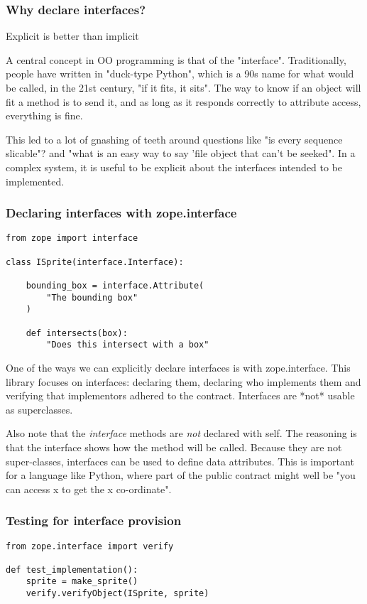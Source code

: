 \documentclass[ignorenonframetext,aspectration=169]{beamer}
\begin{document}
\begin{frame}[fragile]
\frametitle{Why declare interfaces?}

Explicit is better than implicit
\end{frame}

A central concept in OO programming is that of the "interface".
Traditionally,
people have written in "duck-type Python",
which is a 90s name for what would be called,
in the 21st century,
"if it fits, it sits".
The way to know if an object will fit a method is to send it,
and as long as it responds correctly to attribute access,
everything is fine.

This led to a lot of gnashing of teeth around questions like
"is every sequence slicable"?
and
"what is an easy way to say 'file object that can't be seeked".
In a complex system,
it is useful to be explicit about the interfaces intended to be
implemented.

\begin{frame}[fragile]
\frametitle{Declaring interfaces with zope.interface}

\begin{lstlisting}
from zope import interface

class ISprite(interface.Interface):

    bounding_box = interface.Attribute(
        "The bounding box"
    )

    def intersects(box):
        "Does this intersect with a box"
\end{lstlisting}

\end{frame}

One of the ways we can explicitly declare interfaces is with
zope.interface.
This library focuses on interfaces:
declaring them,
declaring who implements them
and verifying that implementors adhered to the contract.
Interfaces are
*not*
usable as superclasses.

Also note that the {\em interface} methods
are {\em not} declared with self.
The reasoning is that the interface shows how the method
will be called.
Because they are not super-classes,
interfaces can be used to define data attributes.
This is important for a language like Python,
where part of the public contract might well be
"you can access x to get the x co-ordinate".

\begin{frame}[fragile]
\frametitle{Testing for interface provision}

\begin{lstlisting}
from zope.interface import verify

def test_implementation():
    sprite = make_sprite()
    verify.verifyObject(ISprite, sprite)
\end{lstlisting}

\end{frame}
\end{document}
